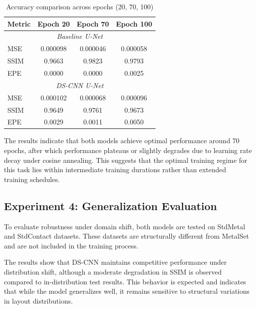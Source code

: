\documentclass[conference]{IEEEtran}
\begin{document}
\begin{table}[!t]
\centering
\caption{Accuracy comparison across epochs (20, 70, 100)}
\label{tab:accuracy_epochs}
\renewcommand{\arraystretch}{1.2}

\begin{tabular*}{\columnwidth}{@{\extracolsep{\fill}} lccc}
\hline
\textbf{Metric} & \textbf{Epoch 20} & \textbf{Epoch 70} & \textbf{Epoch 100} \\
\hline

\multicolumn{4}{c}{\textit{Baseline U-Net}} \\
MSE  & 0.000098 & 0.000046 & 0.000058 \\
SSIM & 0.9663   & 0.9823   & 0.9793 \\
EPE  & 0.0000   & 0.0000   & 0.0025 \\
\hline

\multicolumn{4}{c}{\textit{DS-CNN U-Net}} \\
MSE  & 0.000102 & 0.000068 & 0.000096 \\
SSIM & 0.9649   & 0.9761   & 0.9673 \\
EPE  & 0.0029   & 0.0011   & 0.0050 \\
\hline

\end{tabular*}
\end{table}


The results indicate that both models achieve optimal performance around 70 epochs, after which performance plateaus or slightly degrades due to learning rate decay under cosine annealing. This suggests that the optimal training regime for this task lies within intermediate training durations rather than extended training schedules.

\subsection{\textbf{Experiment 4: Generalization Evaluation}}

To evaluate robustness under domain shift, both models are tested on StdMetal and StdContact datasets. These datasets are structurally different from MetalSet and are not included in the training process.

The results show that DS-CNN maintains competitive performance under distribution shift, although a moderate degradation in SSIM is observed compared to in-distribution test results. This behavior is expected and indicates that while the model generalizes well, it remains sensitive to structural variations in layout distributions.
\end{document}
